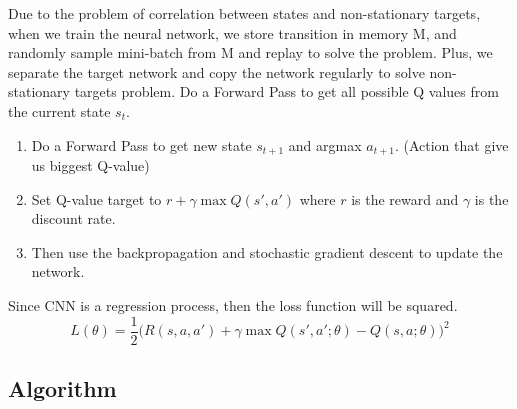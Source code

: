Due to the problem of correlation between states and non-stationary targets, when we train the neural network, we store transition in memory M, and randomly sample mini-batch from M and replay to solve the problem. Plus, we separate the target network and copy the network regularly to solve non-stationary targets problem. Do a Forward Pass to get all possible Q values from the current state $s_t$.
\begin{enumerate}{}
\item Do a Forward Pass to get new state $s_{t+1}$ and argmax $a_{t+1}$. (Action that give us biggest Q-value)
\item Set Q-value target to $r+\gamma  \max Q(s',a')$ where $r$ is the reward and $\gamma$ is the discount rate.
\item Then use the backpropagation and stochastic gradient descent to update the network.
\end{enumerate}

Since CNN is a regression process, then the loss function will be squared.
$$L(\theta )=\frac{1}{2} \Big( R(s,a,a')+\gamma  \max Q(s',a';\theta)-Q(s,a;\theta) \Big)^2$$
\subsection{Algorithm}
